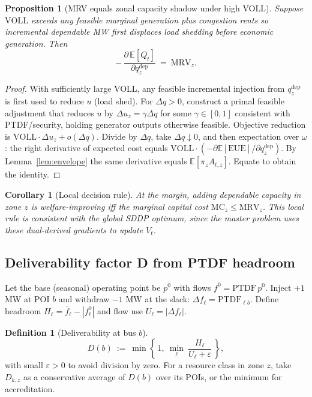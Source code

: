 \documentclass[11pt]{article}
\newcommand{\E}{\mathbb{E}}
\numberwithin{equation}{section}
\newtheorem{proposition}{Proposition}[section]
\newtheorem{corollary}{Corollary}[section]
\theoremstyle{definition}
\newtheorem{definition}{Definition}[section]
\theoremstyle{remark}
\begin{document}
\begin{proposition}[MRV equals zonal capacity shadow under high VOLL]\label{prop:mrv_equals_shadow}
Suppose $\mathrm{VOLL}$ exceeds any feasible marginal generation plus congestion rents so incremental dependable MW first displaces load shedding before economic generation. Then
\begin{equation}
-\,\frac{\partial\,\E[Q_t]}{\partial q^{\mathrm{dep}}_{z}}\ =\ \mathrm{MRV}_{z}.
\end{equation}
\end{proposition}

\begin{proof}
With sufficiently large VOLL, any feasible incremental injection from $q^{\mathrm{dep}}_{z}$ is first used to reduce $u$ (load shed). For $\Delta q>0$, construct a primal feasible adjustment that reduces $u$ by $\Delta u_z=\gamma\Delta q$ for some $\gamma\in[0,1]$ consistent with PTDF/security, holding generator outputs otherwise feasible. Objective reduction is $\mathrm{VOLL}\cdot \Delta u_z + o(\Delta q)$. Divide by $\Delta q$, take $\Delta q\downarrow 0$, and then expectation over $\omega$: the right derivative of expected cost equals $\mathrm{VOLL}\cdot (-\partial \E[\mathrm{EUE}]/\partial q^{\mathrm{dep}}_{z})$. By Lemma~\ref{lem:envelope} the same derivative equals $\E[\pi_{z}A_{t,z}]$. Equate to obtain the identity.
\end{proof}

\begin{corollary}[Local decision rule]\label{cor:local_rule}
At the margin, adding dependable capacity in zone $z$ is welfare-improving iff the marginal capital cost $\mathrm{MC}_{z}\le \mathrm{MRV}_{z}$. This local rule is consistent with the global SDDP optimum, since the master problem uses these dual-derived gradients to update $V_t$.
\end{corollary}

\subsection{ Deliverability factor D from PTDF headroom}
\label{sec:annexF_D}

Let the base (seasonal) operating point be $p^0$ with flows $f^0=\mathrm{PTDF}\,p^0$.
Inject $+1$ MW at POI $b$ and withdraw $-1$ MW at the slack: $\Delta f_{\ell}=\mathrm{PTDF}_{\ell b}$.
Define headroom $H_\ell = \overline f_\ell - |f^0_\ell|$ and flow use $U_\ell = |\Delta f_\ell|$.

\begin{definition}[Deliverability at bus $b$]
\begin{equation}
D(b)\ :=\ \min\!\left\{\,1,\ \min_{\ell}\ \frac{H_\ell}{U_\ell+\varepsilon}\,\right\},
\end{equation}
with small $\varepsilon>0$ to avoid division by zero. For a resource class in zone $z$, take $D_{k,z}$ as a conservative average of $D(b)$ over its POIs, or the minimum for accreditation.
\end{definition}
\end{document}

